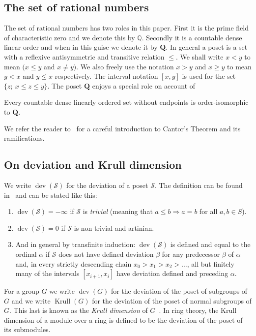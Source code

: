 \documentclass[11pt]{article}
\theoremstyle{definition}
\numberwithin{equation}{section}
\numberwithin{figure}{section}
\numberwithin{table}{section}
\newcommand{\Q}{\mathbb{Q}}
\renewcommand{\implies}{\Rightarrow}
\DeclareMathOperator{\dev}{dev}
\DeclareMathOperator{\krull}{Krull}
\newcommand*{\romanenumi}{\renewcommand*{\theenumi}{\roman{enumi}}}
\begin{document}
\subsection{The set of rational numbers}
The set of rational numbers has two roles in this paper. First it is the prime field of characteristic zero and we denote this by $\Q$. Secondly it is a countable dense linear order and when in this guise we denote it by $\mathbf Q$. In general a poset is a set with a reflexive antisymmetric and transitive relation $\le$. We shall write $x<y$ to mean $(x\le y$ and $x\ne y)$. We also freely use the notation $x>y$ and $x\ge y$ to mean $y<x$ and $y\le x$ respectively. The interval notation $[x,y]$ is used for the set $\{z;\ x\le z\le y\}$. The poset $\mathbf Q$ enjoys a special role on account of

\begin{cantorstheorem}
Every countable dense linearly ordered set without endpoints is order-isomorphic to $\mathbf Q$.
\end{cantorstheorem}

We refer the reader to~\cite[Chapter~9]{perms} for a careful introduction to Cantor's Theorem and its ramifications.


\subsection{On deviation and Krull dimension}

We write $\dev(\mathcal S)$ for the deviation of a poset $\mathcal S$. The definition can be found in~\cite{MR} and can be stated like this:
\begin{enumerate}\romanenumi
\item \label{list2.3.1}$\dev(\mathcal S)=-\infty$ if $\mathcal S$ is \emph{trivial} (meaning that $a\le b\implies a=b$ for all $a,b\in S$).
\item \label{list2.3.2}$\dev(\mathcal S)=0$ if $\mathcal S$ is non-trivial and artinian.
\item \label{list2.3.3}And in general by transfinite induction: $\dev(\mathcal S)$ is defined and equal to the ordinal $\alpha$ if $\mathcal S$ does not have defined deviation $\beta$ for any predecessor $\beta$ of $\alpha$ and, in every strictly descending chain $x_0>x_1>x_2>\dots$, all but finitely many of the intervals $[x_{i+1},x_i] $ have deviation defined and preceding $\alpha$.
\end{enumerate}


For a group $G$ we write $\dev(G)$ for the deviation of the poset of subgroups of $G$ and we write $\krull(G)$ for the deviation of the poset of normal subgroups of $G$. This last is known as the \emph{Krull dimension} of $G$~\cite{Tus}. In ring theory, the Krull dimension of a module over a ring is defined to be the deviation of the poset of its submodules.
\end{document}
